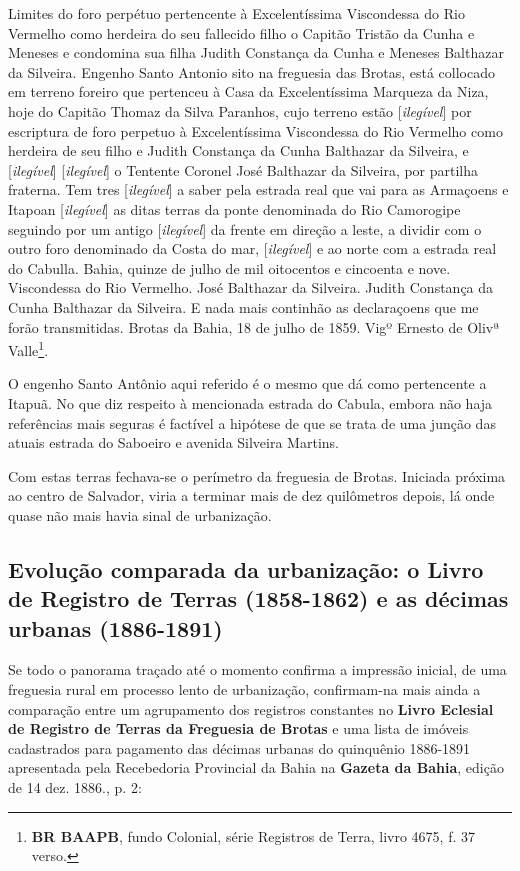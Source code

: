 \begin{citacao}
Limites do foro perpétuo pertencente à Excelentíssima Viscondessa do Rio Vermelho como herdeira do seu fallecido filho o Capitão Tristão da Cunha e Meneses e condomina sua filha Judith Constança da Cunha e Meneses Balthazar da Silveira. Engenho Santo Antonio sito na freguesia das Brotas, está collocado em terreno foreiro que pertenceu à Casa da Excelentíssima Marqueza da Niza, hoje do Capitão Thomaz da Silva Paranhos, cujo terreno estão [\textit{ilegível}] por escriptura de foro perpetuo à Excelentíssima Viscondessa do Rio Vermelho como herdeira de seu filho e Judith Constança da Cunha Balthazar da Silveira, e [\textit{ilegível}] [\textit{ilegível}] o Tentente Coronel José Balthazar da Silveira, por partilha fraterna. Tem tres [\textit{ilegível}] a saber pela estrada real que vai para as Armaçoens e Itapoan [\textit{ilegível}] as ditas terras da ponte denominada do Rio Camorogipe seguindo por um antigo [\textit{ilegível}] da frente em direção a leste, a dividir com o outro foro denominado da Costa do mar, [\textit{ilegível}] e ao norte com a estrada real do Cabulla. Bahia, quinze de julho de mil oitocentos e cincoenta e nove. Viscondessa do Rio Vermelho. José Balthazar da Silveira. Judith Constança da Cunha Balthazar da Silveira. E nada mais continhão as declaraçoens que me forão transmitidas. Brotas da Bahia, 18 de julho de 1859. Vigº Ernesto de Olivª Valle\footnote{\textbf{BR BAAPB}, fundo Colonial, série Registros de Terra, livro 4675, f. 37 verso.}.
\end{citacao}

O engenho Santo Antônio aqui referido é o mesmo que  dá como pertencente a Itapuã. No que diz respeito à mencionada estrada do Cabula, embora não haja referências mais seguras é factível a hipótese de que se trata de uma junção das atuais estrada do Saboeiro e avenida Silveira Martins.

Com estas terras fechava-se o perímetro da freguesia de Brotas. Iniciada próxima ao centro de Salvador, viria a terminar mais de dez quilômetros depois, lá onde quase não mais havia sinal de urbanização.

\subsection{Evolução comparada da urbanização: o Livro de Registro de Terras (1858-1862) e as décimas urbanas (1886-1891)}

Se todo o panorama traçado até o momento confirma a impressão inicial, de uma freguesia rural em processo lento de urbanização, confirmam-na mais ainda a comparação entre um agrupamento dos registros constantes no \textbf{Livro Eclesial de Registro de Terras da Freguesia de Brotas} e uma lista de imóveis cadastrados para pagamento das décimas urbanas do quinquênio 1886-1891 apresentada pela Recebedoria Provincial da Bahia na \textbf{Gazeta da Bahia}, edição de 14 dez. 1886., p. 2:

